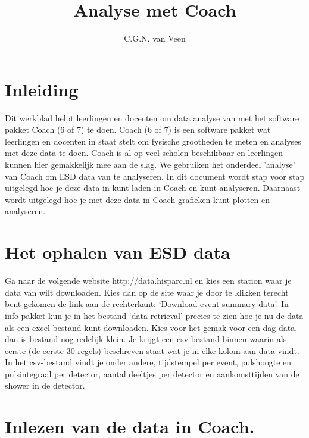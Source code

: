 

\title{Analyse met Coach}
\author{C.G.N. van Veen}



\maketitle

\section{Inleiding}

Dit werkblad helpt leerlingen en docenten om data analyse van \hisparc met 
het software pakket Coach (6 of 7) te doen. Coach (6 of 7) is een software pakket wat leerlingen
en docenten in staat stelt om fysische grootheden te meten en analyses met deze 
data te doen. Coach is al op veel scholen beschikbaar en leerlingen kunnen hier
gemakkelijk mee aan de slag.
We gebruiken het onderdeel 'analyse' van Coach om ESD data van \hisparc te analyseren.
In dit document wordt stap voor stap uitgelegd hoe je deze data in kunt laden in 
Coach en kunt analyseren. Daarnaast wordt uitgelegd hoe je met deze data in Coach
grafieken kunt plotten en analyseren.

\section{Het ophalen van ESD data}

Ga naar de volgende website http://data.hisparc.nl en kies een station waar 
je data van wilt downloaden. Kies dan op de site waar je door te klikken terecht
bent gekomen de link aan de rechterkant: `Download event summary data'.
In info pakket kun je in het bestand `data retrieval' precies te zien hoe je 
nu de data als een excel bestand kunt downloaden.
Kies voor het gemak voor een dag data, dan is bestand nog redelijk klein.
Je krijgt een csv-bestand binnen waarin als eerste (de eerste 30 regels) beschreven staat wat je 
in elke kolom aan data vindt. In het csv-bestand vindt je onder andere, tijdstempel per event,
pulshoogte en pulsintegraal per detector, aantal deeltjes per detector en aankomsttijden van
de shower in de detector.

\section{Inlezen van de data in Coach.}

